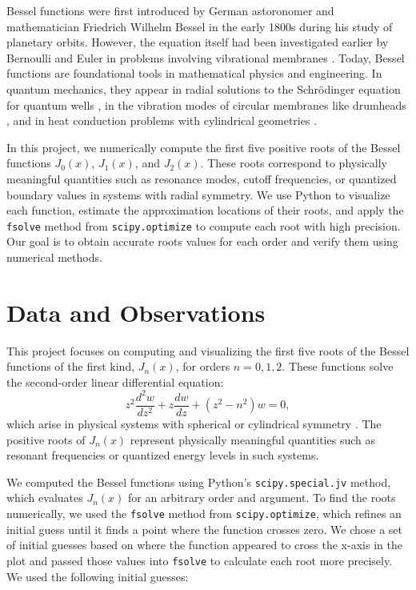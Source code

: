 \documentclass[linenumbers, twocolumn]{aastex631}
\begin{document}
\noindent Bessel functions were first introduced by German astoronomer and
mathematician Friedrich Wilhelm Bessel in the early 1800s during his study of
planetary orbits. However, the equation itself had been investigated earlier
by Bernoulli and Euler in problems involving vibrational membranes
\citet{abramowitz_stegun}. Today, Bessel functions are foundational tools in 
mathematical physics and engineering. In quantum mechanics, they appear in 
radial solutions to the Schrödinger equation for quantum wells \cite{hanson}, in the 
vibration modes of circular membranes like drumheads \cite{tamrin}, and in heat 
conduction problems with cylindrical geometries \cite{tsega}.

\noindent In this project, we numerically compute the first five positive roots
of the Bessel functions $J_0(x)$, $J_1(x)$, and $J_2(x)$. These roots correspond
to physically meaningful quantities such as resonance modes, cutoff frequencies, 
or quantized boundary values in systems with radial symmetry. We use Python to visualize each
function, estimate the approximation locations of their roots, and apply the \texttt{fsolve}
method from \texttt{scipy.optimize} to compute each root with high precision. 
Our goal is to obtain accurate roots values for each order and verify them 
using numerical methods.\\


\section{Data and Observations} \label{sec:data}

This project focuses on computing and visualizing the first five roots of the
Bessel functions of the first kind, $J_n(x)$, for orders $n=0,1,2$. These
functions solve the second-order linear differential equation:
\begin{equation}
    z^2\frac{d^2 w}{dz^2}+z\frac{dw}{dz}+(z^2-n^2)w=0,
\end{equation}
\noindent which arise in physical systems with spherical or cylindrical 
symmetry \citet{abramowitz_stegun}. The positive roots of $J_n(x)$ represent physically meaningful
quantities such as resonant frequencies or quantized energy levels in such
systems.

\noindent We computed the Bessel functions using Python's \texttt{scipy.special.jv}
method, which evaluates $J_n(x)$ for an arbitrary order and argument. To
find the roots numerically, we used the \texttt{fsolve} method from \texttt{scipy.optimize},
which refines an initial guess until it finds a point where the function crosses
zero. We chose a set of initial guesses based on where the function appeared to
cross the x-axis in the plot and passed those values into \texttt{fsolve} to
calculate each root more precisely. We used the following initial guesses:
\end{document}
